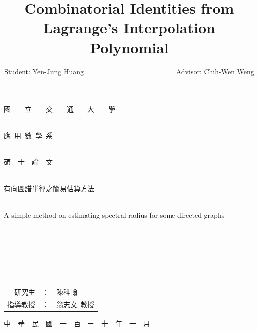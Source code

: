 \documentclass[12pt, a4paper]{article}
\title{Combinatorial Identities from Lagrange's Interpolation Polynomial}
\author{Student: Yen-Jung Huang  ~~~~~~~~~~~~~~~~~~~~~~~~~~Advisor: Chih-Wen Weng}
\date{} %
\theoremstyle{plain}
\theoremstyle{definition}
\begin{document}

\thispagestyle{empty}
\begin{center}
{ \Huge 國~~~~立~~~~交~~~~通~~~~大~~~~學}~\\~\\

\bigskip

{ \Huge 應~用~數~學~系}~\\~\\

\bigskip

{ \Huge 碩~~士~~論~~文}~\\~\\

\bigskip \bigskip\bigskip\bigskip\bigskip\bigskip

{ \Huge 有向圖譜半徑之簡易估算方法}~\\~\\

\bigskip

{ \Huge A simple method on estimating spectral radius for some directed graphs}~\\~\\
~\\~\\~\\~\\~\\
\bigskip \bigskip\bigskip\bigskip\bigskip\bigskip
\bigskip \bigskip\bigskip\bigskip\bigskip\bigskip
\bigskip\bigskip\bigskip

{ \Large
\begin{tabular}{rcl}
研究生&：&陳科翰\\
指導教授&：&翁志文~教授
\end{tabular} }

\bigskip\bigskip
{ \Large 中~~華~~民~~國~~一~~百~~ㄧ~~十~~年~~一~~月 }
\large
\end{center}
\pagebreak
\end{document}
